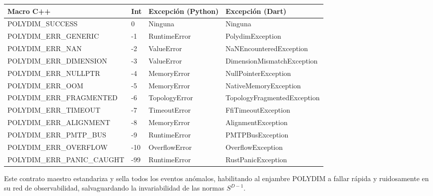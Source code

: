 \centering
\begin{tabular}{|l|l|p{4cm}|p{4cm}|}
\hline
\textbf{Macro C++} & \textbf{Int} & \textbf{Excepción (Python)} & \textbf{Excepción (Dart)} \\ \hline
POLYDIM\_SUCCESS             & 0   & Ninguna                     & Ninguna \\ \hline
POLYDIM\_ERR\_GENERIC        & -1  & RuntimeError                & PolydimException \\ \hline
POLYDIM\_ERR\_NAN            & -2  & ValueError                  & NaNEncounteredException \\ \hline
POLYDIM\_ERR\_DIMENSION      & -3  & ValueError                  & DimensionMismatchException \\ \hline
POLYDIM\_ERR\_NULLPTR        & -4  & MemoryError                 & NullPointerException \\ \hline
POLYDIM\_ERR\_OOM            & -5  & MemoryError                 & NativeMemoryException \\ \hline
POLYDIM\_ERR\_FRAGMENTED     & -6  & TopologyError               & TopologyFragmentedException \\ \hline
POLYDIM\_ERR\_TIMEOUT        & -7  & TimeoutError                & FfiTimeoutException \\ \hline
POLYDIM\_ERR\_ALIGNMENT      & -8  & MemoryError                 & AlignmentException \\ \hline
POLYDIM\_ERR\_PMTP\_BUS      & -9  & RuntimeError                & PMTPBusException \\ \hline
POLYDIM\_ERR\_OVERFLOW       & -10 & OverflowError               & OverflowException \\ \hline
POLYDIM\_ERR\_PANIC\_CAUGHT  & -99 & RuntimeError                & RustPanicException \\ \hline
\end{tabular}


Este contrato maestro estandariza y sella todos los eventos anómalos, habilitando al enjambre POLYDIM a fallar rápida y ruidosamente en su red de observabilidad, salvaguardando la invariabilidad de las normas $S^{D-1}$.
